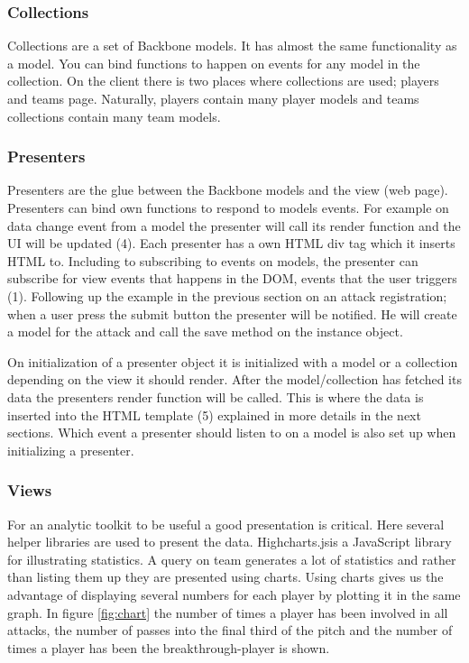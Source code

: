 \subsubsection{Collections}
Collections are a set of Backbone models. It has almost the same functionality as a model. You can bind functions to happen on events for any model in the collection. On the client there is two places where collections are used; players and teams page. Naturally, players contain many player models and teams collections contain many team models.

\subsubsection{Presenters}

Presenters are the glue between the Backbone models and the view (web page).  Presenters can bind own functions to respond to models events. For example on data change event from a model the presenter will call its render function and the \ac{UI} will be updated (4). Each presenter has a own \ac{HTML} div tag which it inserts HTML to. Including to subscribing to events on models, the presenter can subscribe for view events that happens in the \ac{DOM}, events that the user triggers (1). Following up the example in the previous section on an attack registration; when a user press the submit button the presenter will be notified. He will create a model for the attack and call the save method on the instance object. 

On initialization of a presenter object it is initialized with a model or a collection depending on the view it should render.  After the model/collection has fetched its data the presenters render function will be called. This is where the data is inserted into the \ac{HTML} template (5) explained in more details in the next sections. Which event a presenter should listen to on a model is also set up when initializing a presenter.

\subsubsection{Views}

For an analytic toolkit to be useful a good presentation is critical. Here several helper libraries are used to present the data. Highcharts.js\footnotemark is a JavaScript library for illustrating statistics. A query on team generates a lot of statistics and rather than listing them up they are presented using charts. Using charts gives us the advantage of displaying several numbers for each player by plotting it in the same graph. In figure \ref{fig:chart} the number of times a player has been involved in all attacks, the number of passes into the final third of the pitch and the number of times a player has been the breakthrough-player is shown.

